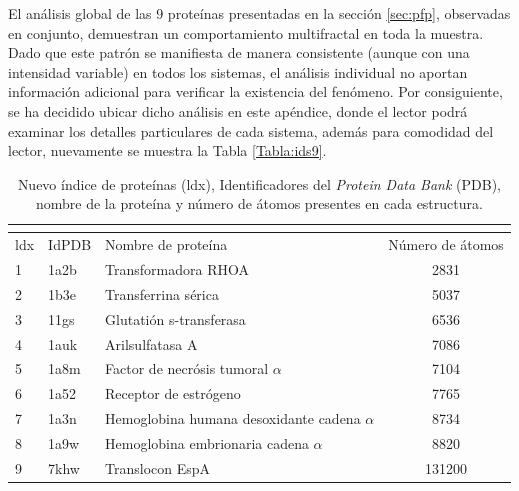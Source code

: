 El an\'alisis global de las 9 proteínas presentadas en la secci\'on \ref{sec:pfp}, observadas en conjunto, demuestran un comportamiento multifractal en toda la muestra. Dado que este patr\'on se manifiesta de manera consistente (aunque con una intensidad variable) en todos los sistemas, el an\'alisis individual no aportan informaci\'on adicional para verificar la existencia del fen\'omeno. Por consiguiente, se ha decidido ubicar dicho an\'alisis en este ap\'endice, donde el lector podr\'a examinar los detalles particulares de cada sistema, además para comodidad del lector, nuevamente se muestra la Tabla \ref{Tabla:ids9}.

\begin{table}[h!]
	\centering
		\begin{footnotesize}
			\begin{tabular}{||lllc||}
				\multicolumn{4}{l}{} \\ 
				\hline
				ldx & IdPDB & Nombre de prote\'{i}na & N\'{u}mero de \'{a}tomos \\
				\hline
				1  & 1a2b & Transformadora RHOA & 2831 \\
				2 & 1b3e & Transferrina s\'{e}rica & 5037 \\
				3 & 11gs & Glutati\'{o}n s-transferasa & 6536 \\ 
				4 & 1auk & Arilsulfatasa A & 7086 \\
				5 & 1a8m & Factor de necr\'{o}sis tumoral $\alpha$ & 7104 \\
				6 & 1a52 & Receptor de estr\'{o}geno & 7765 \\
				7 & 1a3n & Hemoglobina humana desoxidante cadena $\alpha$ & 8734 \\
				8 & 1a9w & Hemoglobina embrionaria cadena $\alpha$ & 8820 \\
				9 & 7khw & Translocon EspA & 131200 \\
				\hline
			\end{tabular}
		\end{footnotesize}
	\caption{Nuevo \'{i}ndice de prote\'{i}nas (ldx), Identificadores del \emph{Protein Data Bank} (PDB), nombre de la prote\'{i}na y n\'{u}mero de \'{a}tomos presentes en cada estructura.}
\end{table}

